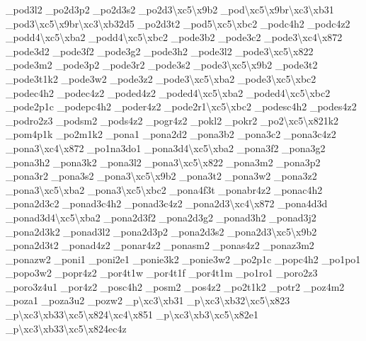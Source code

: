 \begin{DoxyCompactItemize}
\-\_\-pod3l2 \-\_\-po2d3p2 \-\_\-po2d3s2 \-\_\-po2d3\textbackslash{}xc5\textbackslash{}x9b2 \-\_\-pod\textbackslash{}xc5\textbackslash{}x9br\textbackslash{}xc3\textbackslash{}xb31 \-\_\-pod3\textbackslash{}xc5\textbackslash{}x9br\textbackslash{}xc3\textbackslash{}xb32d5 \-\_\-po2d3t2 \-\_\-pod5\textbackslash{}xc5\textbackslash{}xbc2 \-\_\-podc4h2 \-\_\-podc4z2 \-\_\-podd4\textbackslash{}xc5\textbackslash{}xba2 \-\_\-podd4\textbackslash{}xc5\textbackslash{}xbc2 \-\_\-pode3b2 \-\_\-pode3c2 \-\_\-pode3\textbackslash{}xc4\textbackslash{}x872 \-\_\-pode3d2 \-\_\-pode3f2 \-\_\-pode3g2 \-\_\-pode3h2 \-\_\-pode3l2 \-\_\-pode3\textbackslash{}xc5\textbackslash{}x822 \-\_\-pode3m2 \-\_\-pode3p2 \-\_\-pode3r2 \-\_\-pode3s2 \-\_\-pode3\textbackslash{}xc5\textbackslash{}x9b2 \-\_\-pode3t2 \-\_\-pode3t1k2 \-\_\-pode3w2 \-\_\-pode3z2 \-\_\-pode3\textbackslash{}xc5\textbackslash{}xba2 \-\_\-pode3\textbackslash{}xc5\textbackslash{}xbc2 \-\_\-podec4h2 \-\_\-podec4z2 \-\_\-poded4z2 \-\_\-poded4\textbackslash{}xc5\textbackslash{}xba2 \-\_\-poded4\textbackslash{}xc5\textbackslash{}xbc2 \-\_\-pode2p1c \-\_\-podepc4h2 \-\_\-poder4z2 \-\_\-pode2r1\textbackslash{}xc5\textbackslash{}xbc2 \-\_\-podesc4h2 \-\_\-podes4z2 \-\_\-podro2z3 \-\_\-podsm2 \-\_\-pods4z2 \-\_\-pogr4z2 \-\_\-pokl2 \-\_\-pokr2 \-\_\-po2\textbackslash{}xc5\textbackslash{}x821k2 \-\_\-pom4p1k \-\_\-po2m1k2 \-\_\-pona1 \-\_\-pona2d2 \-\_\-pona3b2 \-\_\-pona3c2 \-\_\-pona3c4z2 \-\_\-pona3\textbackslash{}xc4\textbackslash{}x872 \-\_\-po1na3do1 \-\_\-pona3d4\textbackslash{}xc5\textbackslash{}xba2 \-\_\-pona3f2 \-\_\-pona3g2 \-\_\-pona3h2 \-\_\-pona3k2 \-\_\-pona3l2 \-\_\-pona3\textbackslash{}xc5\textbackslash{}x822 \-\_\-pona3m2 \-\_\-pona3p2 \-\_\-pona3r2 \-\_\-pona3s2 \-\_\-pona3\textbackslash{}xc5\textbackslash{}x9b2 \-\_\-pona3t2 \-\_\-pona3w2 \-\_\-pona3z2 \-\_\-pona3\textbackslash{}xc5\textbackslash{}xba2 \-\_\-pona3\textbackslash{}xc5\textbackslash{}xbc2 \-\_\-pona4f3t \-\_\-ponabr4z2 \-\_\-ponac4h2 \-\_\-pona2d3c2 \-\_\-ponad3c4h2 \-\_\-ponad3c4z2 \-\_\-pona2d3\textbackslash{}xc4\textbackslash{}x872 \-\_\-pona4d3d \-\_\-ponad3d4\textbackslash{}xc5\textbackslash{}xba2 \-\_\-pona2d3f2 \-\_\-pona2d3g2 \-\_\-ponad3h2 \-\_\-ponad3j2 \-\_\-pona2d3k2 \-\_\-ponad3l2 \-\_\-pona2d3p2 \-\_\-pona2d3s2 \-\_\-pona2d3\textbackslash{}xc5\textbackslash{}x9b2 \-\_\-pona2d3t2 \-\_\-ponad4z2 \-\_\-ponar4z2 \-\_\-ponasm2 \-\_\-ponas4z2 \-\_\-ponaz3m2 \-\_\-ponazw2 \-\_\-poni1 \-\_\-poni2e1 \-\_\-ponie3k2 \-\_\-ponie3w2 \-\_\-po2p1c \-\_\-popc4h2 \-\_\-po1po1 \-\_\-popo3w2 \-\_\-popr4z2 \-\_\-por4t1w \-\_\-por4t1f \-\_\-por4t1m \-\_\-po1ro1 \-\_\-poro2z3 \-\_\-poro3z4u1 \-\_\-por4z2 \-\_\-posc4h2 \-\_\-posm2 \-\_\-pos4z2 \-\_\-po2t1k2 \-\_\-potr2 \-\_\-poz4m2 \-\_\-poza1 \-\_\-poza3u2 \-\_\-pozw2 \-\_\-p\textbackslash{}xc3\textbackslash{}xb31 \-\_\-p\textbackslash{}xc3\textbackslash{}xb32\textbackslash{}xc5\textbackslash{}x823 \-\_\-p\textbackslash{}xc3\textbackslash{}xb33\textbackslash{}xc5\textbackslash{}x824\textbackslash{}xc4\textbackslash{}x851 \-\_\-p\textbackslash{}xc3\textbackslash{}xb3\textbackslash{}xc5\textbackslash{}x82e1 \-\_\-p\textbackslash{}xc3\textbackslash{}xb33\textbackslash{}xc5\textbackslash{}x824ec4z 
\end{DoxyCompactItemize}
